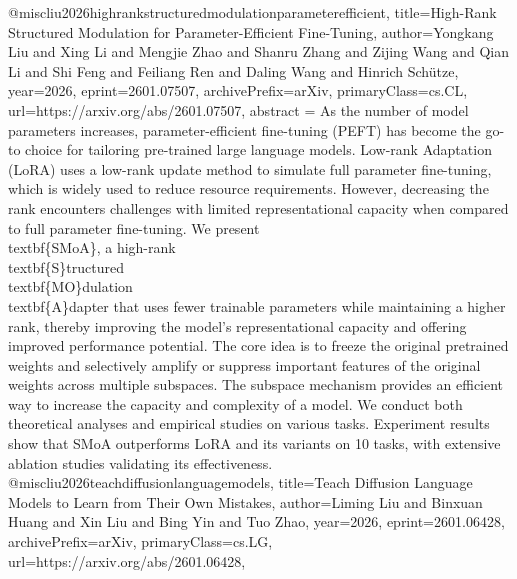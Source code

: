 {}@misc{liu2026highrankstructuredmodulationparameterefficient,
      title={High-Rank Structured Modulation for Parameter-Efficient Fine-Tuning}, 
      author={Yongkang Liu and Xing Li and Mengjie Zhao and Shanru Zhang and Zijing Wang and Qian Li and Shi Feng and Feiliang Ren and Daling Wang and Hinrich Schütze},
      year={2026},
      eprint={2601.07507},
      archivePrefix={arXiv},
      primaryClass={cs.CL},
      url={https://arxiv.org/abs/2601.07507},
      abstract = {As the number of model parameters increases, parameter-efficient fine-tuning (PEFT) has become the go-to choice for tailoring pre-trained large language models. Low-rank Adaptation (LoRA) uses a low-rank update method to simulate full parameter fine-tuning, which is widely used to reduce resource requirements. However, decreasing the rank encounters challenges with limited representational capacity when compared to full parameter fine-tuning. We present \\textbf\{SMoA\}, a high-rank \\textbf\{S\}tructured \\textbf\{MO\}dulation \\textbf\{A\}dapter that uses fewer trainable parameters while maintaining a higher rank, thereby improving the model's representational capacity and offering improved performance potential. The core idea is to freeze the original pretrained weights and selectively amplify or suppress important features of the original weights across multiple subspaces. The subspace mechanism provides an efficient way to increase the capacity and complexity of a model. We conduct both theoretical analyses and empirical studies on various tasks. Experiment results show that SMoA outperforms LoRA and its variants on 10 tasks, with extensive ablation studies validating its effectiveness.}
}@misc{liu2026teachdiffusionlanguagemodels,
      title={Teach Diffusion Language Models to Learn from Their Own Mistakes}, 
      author={Liming Liu and Binxuan Huang and Xin Liu and Bing Yin and Tuo Zhao},
      year={2026},
      eprint={2601.06428},
      archivePrefix={arXiv},
      primaryClass={cs.LG},
      url={https://arxiv.org/abs/2601.06428},
}

